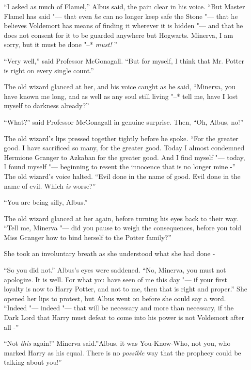 ``I asked as much of Flamel,'' Albus said, the pain clear in his voice.
``But Master Flamel has said "--- that even \emph{he} can no longer keep
safe the Stone "--- that he believes Voldemort has means of finding it
wherever it is hidden "--- and that he does not consent for it to be
guarded anywhere but Hogwarts. Minerva, I am sorry, but it must be done
"--* \emph{must!} ''

``Very well,'' said Professor McGonagall. ``But for myself, I think that
Mr. Potter is right on every single count.''

The old wizard glanced at her, and his voice caught as he said,
``Minerva, you have known me long, and as well as any soul still living
"--* tell me, have I lost myself to darkness already?''

``What?'' said Professor McGonagall in genuine surprise. Then, ``Oh,
Albus, no!''

The old wizard's lips pressed together tightly before he spoke. ``For
the greater good. I have sacrificed so many, for the greater good. Today
I almost condemned Hermione Granger to Azkaban for the greater good. And
I find myself "--- today, I found myself "--- beginning to resent the
innocence that is no longer mine -'' The old wizard's voice halted.
``Evil done in the name of good. Evil done in the name of evil. Which
\emph{is} worse?''

``You are being silly, Albus.''

The old wizard glanced at her again, before turning his eyes back to
their way. ``Tell me, Minerva "--- did you pause to weigh the consequences,
before you told Miss Granger how to bind herself to the Potter family?''

She took an involuntary breath as she understood what she had done -

``So you did not.'' Albus's eyes were saddened. ``No, Minerva, you must
not apologize. It is well. For what you have seen of me this day "--- if
your first loyalty is now to Harry Potter, and not to me, then that is
right and proper.'' She opened her lips to protest, but Albus went on
before she could say a word. ``Indeed "--- indeed "--- that will be necessary
and more than necessary, if the Dark Lord that Harry must defeat to come
into his power is not Voldemort after all -''

``Not \emph{this} again!'' Minerva said.''Albus, it was You-Know-Who, not
you, who marked Harry as his equal. There is no \emph{possible} way that
the prophecy could be talking about you!''

